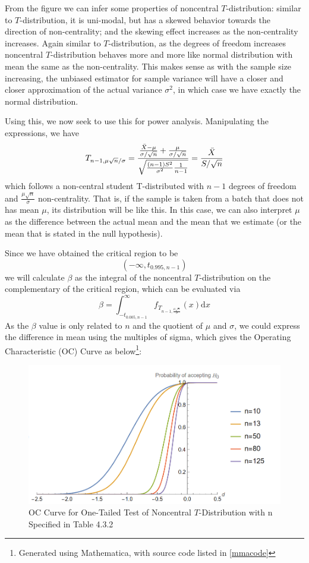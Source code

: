 \documentclass[12pt]{article}
\def\d{\mathrm{d}}
\begin{document}
From the figure we can infer some properties of noncentral $T$-distribution: similar to $T$-distribution, it is uni-modal, but has a skewed behavior towards the direction of non-centrality; and the skewing effect increases as the non-centrality increases. Again similar to $T$-distribution, as the degrees of freedom increases noncentral $T$-distribution behaves more and more like normal distribution with mean the same as the non-centrality. This makes sense as with the sample size increasing, the unbiased estimator for sample variance will have a closer and closer approximation of the actual variance $\sigma^2$, in which case we have exactly the normal distribution.

Using this, we now seek to use this for power analysis. Manipulating the expressions, we have
\begin{equation}\label{noncentralt}
    T_{n-1,\mu\sqrt{n}/\sigma}=\frac{\frac{\Bar{X}-\mu}{\sigma/\sqrt{n}}+\frac{\mu}{\sigma/\sqrt{n}}}{\sqrt{\frac{(n-1)S^2}{\sigma^2}\frac{1}{n-1}}}=\frac{\Bar{X}}{S/\sqrt{n}}
\end{equation}
which follows a non-central student T-distributed with $n-1$ degrees of freedom and $\frac{\mu\sqrt{n}}{\sigma}$ non-centrality. That is, if the sample is taken from a batch that does not has mean $\mu$, its distribution will be like this. In this case, we can also interpret $\mu$ as the difference between the actual mean and the mean that we estimate (or the mean that is stated in the null hypothesis).

Since we have obtained the critical region to be
$$
(-\infty, t_{0.995,n-1})
$$
we will calculate $\beta$ as the integral of the noncentral $T$-distribution on the complementary of the critical region, which can be evaluated via
$$
\beta = \int_{-t_{0.005, n-1}}^{\infty} f_{T_{n-1, \frac{\mu\sqrt{n}}{\sigma}}}(x) \d x
$$
As the $\beta$ value is only related to $n$ and the quotient of $\mu$ and $\sigma$, we could express the difference in mean using the multiples of sigma, which gives the Operating Characteristic (OC) Curve as below\footnote{Generated using Mathematica, with source code listed in \ref{mmacode}}:

\begin{figure}[htbp]
    \centering
    \includegraphics[scale=0.6]{img/oc_noncentral_t.png}
    \caption{OC Curve for One-Tailed Test of Noncentral $T$-Distribution with n Specified in Table 4.3.2}
\end{figure}
\end{document}
